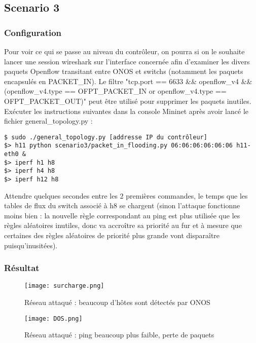 \subsection{Scenario 3}

\subsubsection{Configuration}

Pour voir ce qui se passe au niveau du contrôleur, on pourra si on le souhaite lancer une session wireshark sur l'interface concernée afin d'examiner les divers paquets Openflow transitant entre ONOS et switchs (notamment les paquets encapsulés en PACKET\_IN). Le filtre "tcp.port == 6633 \&\& openflow\_v4 \&\& (openflow\_v4.type == OFPT\_PACKET\_IN or openflow\_v4.type == OFPT\_PACKET\_OUT)" peut être utilisé pour supprimer les paquets inutiles.
Exécuter les instructions suivantes dans la console Mininet après avoir lancé le fichier general\_topology.py :

\begin{verbatim}
$ sudo ./general_topology.py [addresse IP du contrôleur]
$> h11 python scenario3/packet_in_flooding.py 06:06:06:06:06:06 h11-eth0 &
$> iperf h1 h8
$> iperf h4 h8
$> iperf h12 h8
\end{verbatim}

Attendre quelques secondes entre les 2 premières commandes, le temps que les tables de flux du switch associé à h8 se chargent (sinon l'attaque fonctionne moins bien : la nouvelle règle correspondant au ping est plus utilisée que les règles aléatoires inutiles, donc va accroître sa priorité au fur et à mesure que certaines des règles aléatoires de priorité plus grande vont disparaître puisqu'inusitées).


\subsubsection{Résultat}

\begin{figure}[h]
  	\centering
  	\texttt{[image: surcharge.png]}
  	\caption{Réseau attaqué : beaucoup d'hôtes sont détectés par ONOS}
\end{figure}

\begin{figure}[h]
  	\centering
  	\texttt{[image: DOS.png]}
  	\caption{Réseau attaqué : ping beaucoup plus faible, perte de paquets}
\end{figure}


